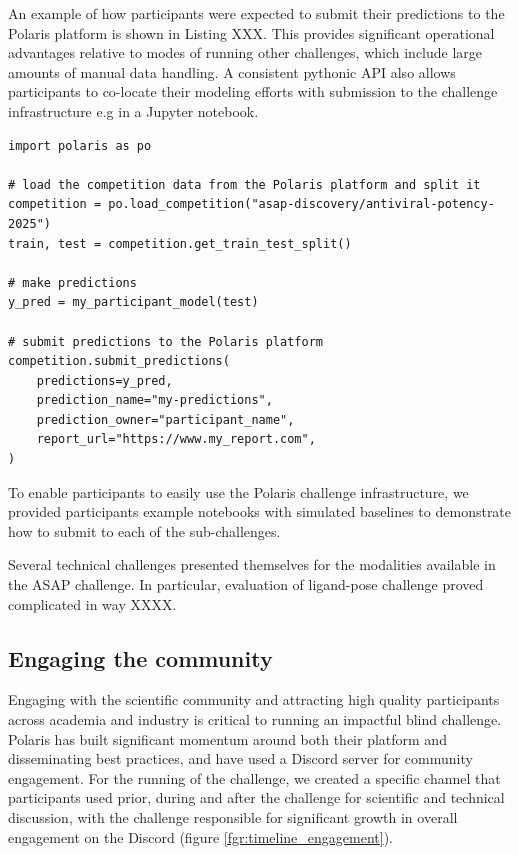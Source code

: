 \documentclass[journal=jacsat,manuscript=article]{achemso}
\begin{document}
An example of how participants were expected to submit their predictions to the Polaris platform is shown in Listing XXX. This provides significant operational advantages relative to modes of running other challenges, which include large amounts of manual data handling. A consistent pythonic API also allows participants to co-locate their modeling efforts with submission to the challenge infrastructure e.g in a Jupyter notebook.

\begin{verbatim}
import polaris as po

# load the competition data from the Polaris platform and split it
competition = po.load_competition("asap-discovery/antiviral-potency-2025")
train, test = competition.get_train_test_split()

# make predictions
y_pred = my_participant_model(test)

# submit predictions to the Polaris platform
competition.submit_predictions(
    predictions=y_pred,
    prediction_name="my-predictions",
    prediction_owner="participant_name",
    report_url="https://www.my_report.com",
)
\end{verbatim}

To enable participants to easily use the Polaris challenge infrastructure, we provided participants example notebooks with simulated baselines to demonstrate how to submit to each of the sub-challenges. 

Several technical challenges presented themselves for the modalities available in the ASAP challenge. In particular, evaluation of ligand-pose challenge proved complicated in way XXXX.


\subsection{Engaging the community}

Engaging with the scientific community and attracting high quality participants across academia and industry is critical to running an impactful blind challenge. Polaris has built significant momentum around both their platform and disseminating best practices, and have used a Discord server for community engagement. For the running of the challenge, we created a specific channel  that participants used prior, during and after the challenge for scientific and technical discussion, with the challenge responsible for significant growth in overall engagement on the Discord (figure \ref{fgr:timeline_engagement}). 
\end{document}
